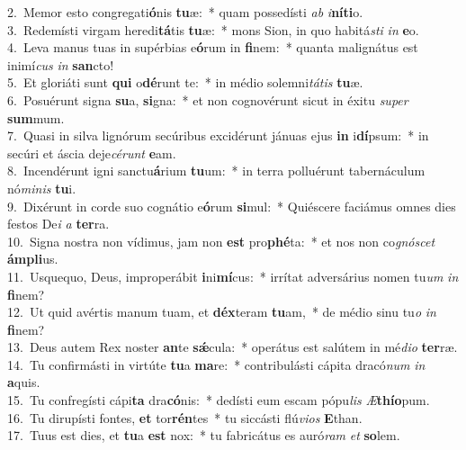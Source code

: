{2.~}Memor esto congregati\textbf{ó}nis \textbf{tu}æ:~* quam possedísti \textit{ab} \textit{i}\textbf{ní}\textbf{ti}o.\\
{3.~}Redemísti virgam heredi\textbf{tá}tis \textbf{tu}æ:~* mons Sion, in quo habitá\textit{sti} \textit{in} \textbf{e}o.\\
{4.~}Leva manus tuas in supérbias e\textbf{ó}rum in \textbf{fi}nem:~* quanta malignátus est inimí\textit{cus} \textit{in} \textbf{san}cto!\\
{5.~}Et gloriáti sunt \textbf{qui} o\textbf{dé}runt te:~* in médio solemni\textit{tá}\textit{tis} \textbf{tu}æ.\\
{6.~}Posuérunt signa \textbf{su}a, \textbf{si}gna:~* et non cognovérunt sicut in éxitu \textit{su}\textit{per} \textbf{sum}mum.\\
{7.~}Quasi in silva lignórum secúribus excidérunt jánuas ejus \textbf{in} i\textbf{dí}psum:~* in secúri et áscia deje\textit{cé}\textit{runt} \textbf{e}am.\\
{8.~}Incendérunt igni sanctu\textbf{á}rium \textbf{tu}um:~* in terra polluérunt tabernáculum nó\textit{mi}\textit{nis} \textbf{tu}i.\\
{9.~}Dixérunt in corde suo cognátio e\textbf{ó}rum \textbf{si}mul:~* Quiéscere faciámus omnes dies festos De\textit{i} \textit{a} \textbf{ter}ra.\\
{10.~}Signa nostra non vídimus, jam non \textbf{est} pro\textbf{phé}ta:~* et nos non co\textit{gnó}\textit{scet} \textbf{ám}\textbf{pli}us.\\
{11.~}Usquequo, Deus, improperábit \textbf{i}ni\textbf{mí}cus:~* irrítat adversárius nomen tu\textit{um} \textit{in} \textbf{fi}nem?\\
{12.~}Ut quid avértis manum tuam, et \textbf{déx}teram \textbf{tu}am,~* de médio sinu tu\textit{o} \textit{in} \textbf{fi}nem?\\
{13.~}Deus autem Rex noster \textbf{an}te \textbf{sǽ}cula:~* operátus est salútem in mé\textit{di}\textit{o} \textbf{ter}ræ.\\
{14.~}Tu confirmásti in virtúte \textbf{tu}a \textbf{ma}re:~* contribulásti cápita dracó\textit{num} \textit{in} \textbf{a}quis.\\
{15.~}Tu confregísti cápi\textbf{ta} dra\textbf{có}nis:~* dedísti eum escam pópu\textit{lis} \textit{Æ}\textbf{thí}\textbf{o}pum.\\
{16.~}Tu dirupísti fontes, \textbf{et} tor\textbf{rén}tes~* tu siccásti flú\textit{vi}\textit{os} \textbf{E}than.\\
{17.~}Tuus est dies, et \textbf{tu}a \textbf{est} nox:~* tu fabricátus es auró\textit{ram} \textit{et} \textbf{so}lem.\\
